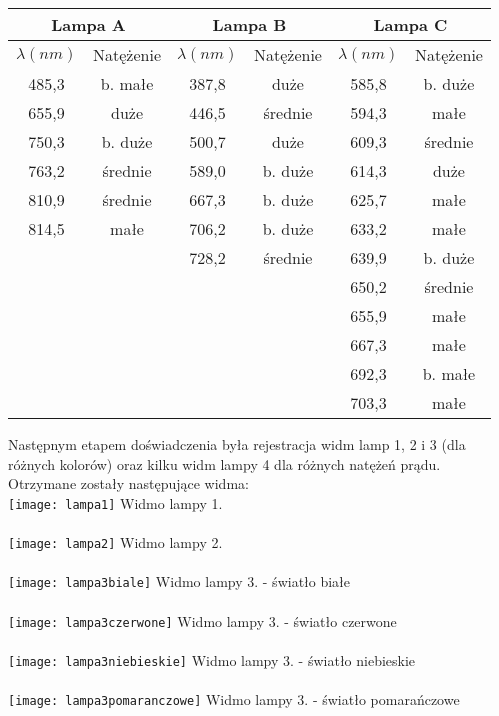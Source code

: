 \documentclass[10pt,a4paper]{article}
\begin{document}
\begin{center}
\begin{tabular}{|c|c|c|c|c|c|}
\multicolumn{2}{c}{Lampa A} & \multicolumn{2}{c}{Lampa B} & \multicolumn{2}{c}{Lampa C}\\
\hline
$\lambda (nm)$ & Natężenie & $\lambda (nm)$ & Natężenie & $\lambda (nm)$ & Natężenie\\
\hline
485,3 & b. małe & 387,8 & duże & 585,8 & b. duże\\
\hline
655,9 & duże & 446,5 & średnie & 594,3 & małe \\
\hline
750,3 & b. duże & 500,7 & duże & 609,3 & średnie \\
\hline
763,2 & średnie & 589,0 & b. duże & 614,3 & duże \\
\hline
810,9 & średnie & 667,3 & b. duże & 625,7 & małe \\
\hline
814,5 & małe & 706,2 & b. duże & 633,2 & małe \\
\hline
&& 728,2 & średnie & 639,9 & b. duże \\
\hline
&&&& 650,2 & średnie \\
\hline
&&&& 655,9 & małe \\
\hline
&&&& 667,3 & małe \\
\hline
&&&& 692,3 & b. małe \\
\hline
&&&& 703,3 & małe \\
\hline

\end{tabular}
\end{center}

\newpage
Następnym etapem doświadczenia była rejestracja widm lamp 1, 2 i 3 (dla różnych kolorów) oraz kilku widm lampy 4 dla różnych natężeń prądu. Otrzymane zostały następujące widma:\\

\texttt{[image: lampa1]}
Widmo lampy 1.\\
\\
\texttt{[image: lampa2]}
Widmo lampy 2.\\
\\

\texttt{[image: lampa3biale]}
Widmo lampy 3. - światło białe\\
\\
\texttt{[image: lampa3czerwone]}
Widmo lampy 3. - światło czerwone\\
\\
\texttt{[image: lampa3niebieskie]}
Widmo lampy 3. - światło niebieskie\\
\\
\texttt{[image: lampa3pomaranczowe]}
Widmo lampy 3. - światło pomarańczowe\\
\\
\end{document}
